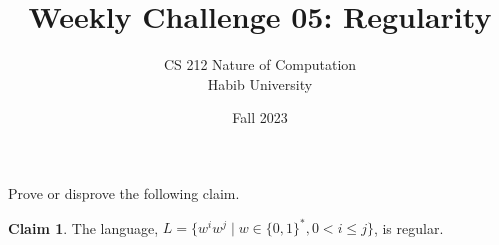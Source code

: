 \documentclass[a4paper]{exam}
\title{Weekly Challenge 05: Regularity}
\author{CS 212 Nature of Computation\\Habib University}
\date{Fall 2023}
\theoremstyle{definition}
\theoremstyle{claim}
\newtheorem{claim}{Claim}
\begin{document}
\maketitle

\begin{questions}


  Prove or disprove the following claim.
  \begin{claim}
    The language, $L = \{ w^iw^j \mid w\in\{0,1\}^*, 0 < i \le j \}$, is regular.
  \end{claim}

  \begin{solution}
    
  \end{solution}
  
\end{questions}
\end{document}
